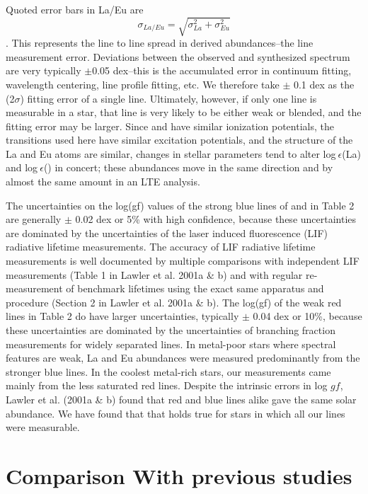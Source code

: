 \documentclass[12pt,preprint]{aastex}
\begin{document}
{Quoted error bars in La/Eu are $$\sigma_{La/Eu}=\sqrt{\sigma_{La}^2+\sigma_{Eu}^2}$$. This represents the line to line spread in derived abundances--the line measurement error.  Deviations between the observed and synthesized spectrum are very typically $\pm$0.05 dex--this is the accumulated error in continuum fitting, wavelength centering, line profile fitting, etc.  We therefore take $\pm$ 0.1 dex as the (2$\sigma$) fitting error of a single line.  Ultimately, however, if only one line is measurable in a star, that line is very likely to be either  weak or blended, and the fitting error may be larger.  Since  and  have similar ionization potentials, the transitions used here have similar excitation potentials, and the structure of the La and Eu atoms are similar, changes in stellar parameters tend to alter log$~\epsilon$(La) and log$~\epsilon$() in concert; these abundances move in the same direction and by almost the same amount in an LTE analysis.  

The uncertainties on the log(gf) values of the strong blue lines of  and  in Table 2 are generally $\pm$ 0.02 dex or 5\% with high
confidence, because these uncertainties are dominated by the uncertainties of the laser induced fluorescence (LIF) radiative lifetime measurements.  The accuracy of LIF radiative lifetime measurements is well documented by multiple comparisons with independent LIF measurements (Table 1 in Lawler et al. 2001a \& b) and with regular re-measurement of benchmark lifetimes using the exact same apparatus and procedure (Section 2 in Lawler et al. 2001a \& b).  The log(gf) of the weak red lines in Table 2 do have larger uncertainties, typically $\pm$ 0.04 dex or 10\%, because these uncertainties are dominated by the uncertainties of branching fraction measurements for widely separated lines.  In metal-poor stars where spectral features are weak,  La and Eu abundances were measured predominantly from the stronger blue lines.  In the coolest metal-rich stars, our measurements came mainly from the less saturated red lines.  Despite the intrinsic errors in log $gf$, Lawler et al. (2001a \& b) found that red and blue lines alike gave the same solar abundance.  We have found that that holds true for stars in which all our lines were measurable.

\section{Comparison With previous studies \label{compare}}

}
\end{document}
